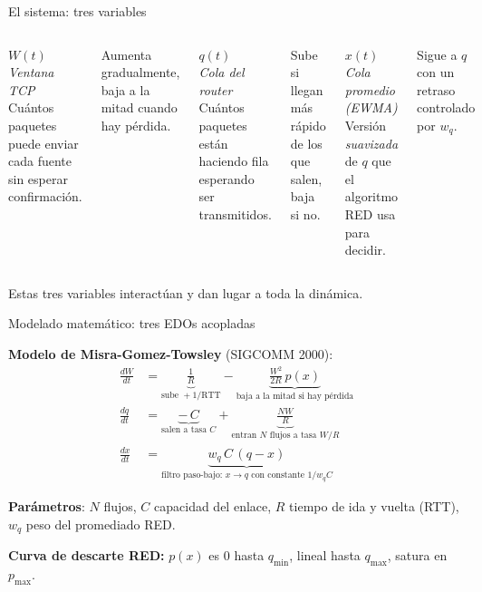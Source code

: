 \documentclass[10pt,aspectratio=169]{beamer}
\begin{document}
\begin{frame}{El sistema: tres variables}

\begin{columns}[T,onlytextwidth]
\centering
\textbf{\color{tcpblue}$W(t)$}\\[0.3em]
\textit{Ventana TCP}\\[0.5em]
\small Cuántos paquetes puede enviar cada fuente sin esperar confirmación.

\vspace{0.5em}
{\footnotesize Aumenta gradualmente, baja a la mitad cuando hay pérdida.}

\centering
\textbf{\color{redred}$q(t)$}\\[0.3em]
\textit{Cola del router}\\[0.5em]
\small Cuántos paquetes están haciendo fila esperando ser transmitidos.

\vspace{0.5em}
{\footnotesize Sube si llegan más rápido de los que salen, baja si no.}

\centering
\textbf{\color{abmgreen}$x(t)$}\\[0.3em]
\textit{Cola promedio (EWMA)}\\[0.5em]
\small Versión \emph{suavizada} de $q$ que el algoritmo RED usa para decidir.

\vspace{0.5em}
{\footnotesize Sigue a $q$ con un retraso controlado por $w_q$.}
\end{columns}

\vspace{1em}
\centering
Estas tres variables interactúan y dan lugar a toda la dinámica.
\end{frame}

\begin{frame}{Modelado matemático: tres EDOs acopladas}

\textbf{Modelo de Misra-Gomez-Towsley} (SIGCOMM 2000):
\begin{align*}
\frac{dW}{dt} &= \underbrace{\frac{1}{R}}_{\text{sube }+1\text{/RTT}} - \underbrace{\frac{W^2}{2R}\, p(x)}_{\text{baja a la mitad si hay pérdida}}\\[0.2em]
\frac{dq}{dt} &= \underbrace{-\,C}_{\text{salen a tasa }C} + \underbrace{\frac{NW}{R}}_{\text{entran }N\text{ flujos a tasa }W/R}\\[0.2em]
\frac{dx}{dt} &= \underbrace{w_q\, C\,(q-x)}_{\text{filtro paso-bajo: }x\to q\text{ con constante }1/w_qC}
\end{align*}

\vspace{0.3em}
\small
\textbf{Parámetros}: $N$ flujos, $C$ capacidad del enlace, $R$ tiempo de ida y vuelta (RTT),
$w_q$ peso del promediado RED.

\vspace{0.3em}
\textbf{Curva de descarte RED:} $p(x)$ es 0 hasta $q_{\min}$, lineal hasta $q_{\max}$, satura en $p_{\max}$.
\end{frame}
\end{document}
